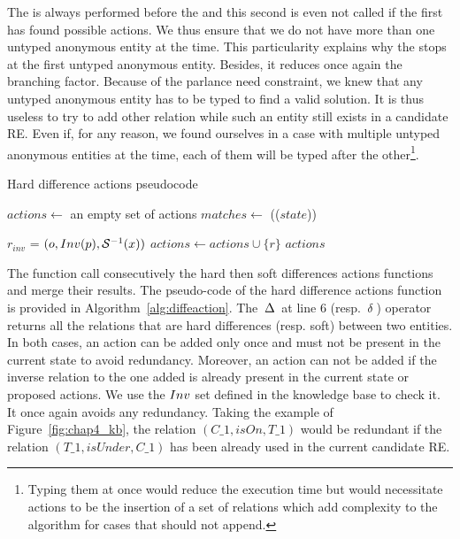 The \typingactions{} is always performed before the \differenceactions{} and this second is even not called if the first has found possible actions. We thus ensure that we do not have more than one untyped anonymous entity at the time. This particularity explains why the \typingactions{} stops at the first untyped anonymous entity. Besides, it reduces once again the branching factor. Because of the parlance need constraint, we knew that any untyped anonymous entity has to be typed to find a valid solution. It is thus useless to try to add other relation while such an entity still exists in a candidate RE. Even if, for any reason, we found ourselves in a case with multiple untyped anonymous entities at the time, each of them will be typed after the other\footnote{Typing them at once would reduce the execution time but would necessitate actions to be the insertion of a set of relations which add complexity to the algorithm for cases that should not append.}.

\begin{algorithm}[htb!]
\caption{\label{alg:diffeaction} Hard difference actions pseudocode}
\begin{algorithmic}[1]
    \State $actions\leftarrow$ an empty set of actions
    \State $matches\leftarrow$ \sparqlresult(\toquery($state$))

                \State $r_{inv}$ = $(o, Inv(p), \mathcal{S}^{-1}(x))$
                    \State $\textit{actions} \gets \textit{actions} \cup \{r\}$
                \EndIf
            \EndFor
        \EndIf
    \EndFor
    \Return $actions$
\EndFunction
\end{algorithmic}
\end{algorithm}

The \differenceactions{} function call consecutively the hard then soft differences actions functions and merge their results. The pseudo-code of the hard difference actions function is provided in Algorithm~\ref{alg:diffeaction}. The $\,\Delta\,$ at line 6 (resp. $\,\delta\,$) operator returns all the relations that are hard differences (resp. soft) between two entities. In both cases, an action can be added only once and must not be present in the current state to avoid redundancy. Moreover, an action can not be added if the inverse relation to the one added is already present in the current state or proposed actions. We use the $Inv$ set defined in the knowledge base to check it. It once again avoids any redundancy. Taking the example of Figure~\ref{fig:chap4_kb}, the relation $(C\_1, isOn, T\_1)$ would be redundant if the relation $(T\_1, isUnder, C\_1)$ has been already used in the current candidate RE.

